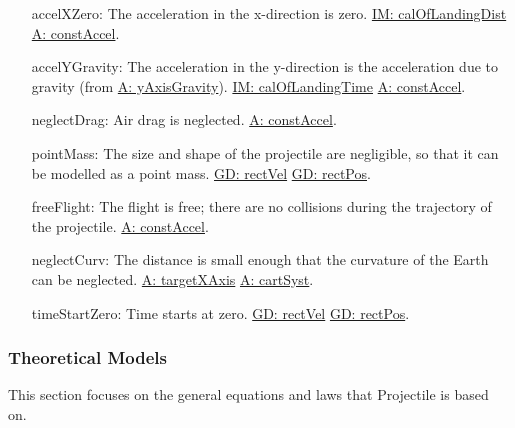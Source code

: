 \documentclass[12pt]{article}
\begin{document}
\begin{itemize}
\item[accelXZero:\phantomsection\label{accelXZero}]The acceleration in the x-direction is zero. \hyperref[IM:calOfLandingDist]{IM: calOfLandingDist} \hyperref[constAccel]{A: constAccel}.
\item[accelYGravity:\phantomsection\label{accelYGravity}]The acceleration in the y-direction is the acceleration due to gravity (from \hyperref[yAxisGravity]{A: yAxisGravity}). \hyperref[IM:calOfLandingTime]{IM: calOfLandingTime} \hyperref[constAccel]{A: constAccel}.
\item[neglectDrag:\phantomsection\label{neglectDrag}]Air drag is neglected. \hyperref[constAccel]{A: constAccel}.
\item[pointMass:\phantomsection\label{pointMass}]The size and shape of the projectile are negligible, so that it can be modelled as a point mass. \hyperref[GD:rectVel]{GD: rectVel} \hyperref[GD:rectPos]{GD: rectPos}.
\item[freeFlight:\phantomsection\label{freeFlight}]The flight is free; there are no collisions during the trajectory of the projectile. \hyperref[constAccel]{A: constAccel}.
\item[neglectCurv:\phantomsection\label{neglectCurv}]The distance is small enough that the curvature of the Earth can be neglected. \hyperref[targetXAxis]{A: targetXAxis} \hyperref[cartSyst]{A: cartSyst}.
\item[timeStartZero:\phantomsection\label{timeStartZero}]Time starts at zero. \hyperref[GD:rectVel]{GD: rectVel} \hyperref[GD:rectPos]{GD: rectPos}.
\end{itemize}
\subsubsection{Theoretical Models}
\label{Sec:TMs}
This section focuses on the general equations and laws that Projectile is based on.
\par~
\end{document}
